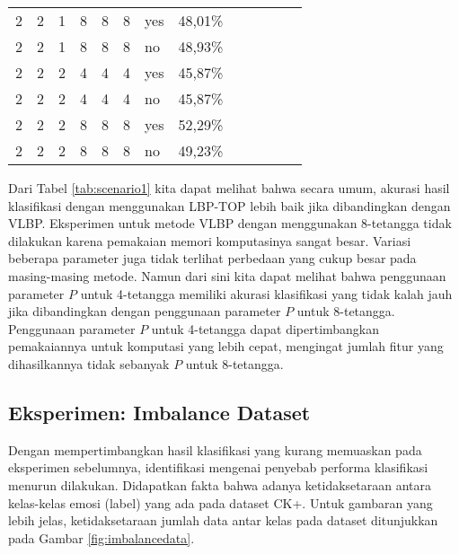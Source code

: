 \documentclass[review,3p,12pt,times]{elsarticle}
\begin{document}
\begin{table}[htbp]
\begin{tabular}{C{0.7cm}C{0.7cm}C{0.7cm}C{0.7cm}C{0.7cm}C{0.7cm}C{0.7cm}rC{0.7cm}C{0.7cm}C{0.7cm}C{0.7cm}r}
    2     & 2     & 1     & 8     & 8     & 8     & yes   & 48,01\% &              &       &       &       &  \\
    2     & 2     & 1     & 8     & 8     & 8     & no    & 48,93\% &              &       &       &       &  \\
    2     & 2     & 2     & 4     & 4     & 4     & yes   & 45,87\% &              &       &       &       &  \\
    2     & 2     & 2     & 4     & 4     & 4     & no    & 45,87\% &              &       &       &       &  \\
    2     & 2     & 2     & 8     & 8     & 8     & yes   & 52,29\% &              &       &       &       &  \\
    2     & 2     & 2     & 8     & 8     & 8     & no    & 49,23\% &              &       &       &       &  \\
    \bottomrule
    \end{tabular}%
  \label{tab:addlabel}%
\end{table}%

Dari Tabel \ref{tab:scenario1} kita dapat melihat bahwa secara umum, akurasi hasil klasifikasi dengan menggunakan LBP-TOP lebih baik jika dibandingkan dengan VLBP. Eksperimen untuk metode VLBP dengan menggunakan 8-tetangga tidak dilakukan karena pemakaian memori komputasinya sangat besar. Variasi beberapa parameter juga tidak terlihat perbedaan yang cukup besar pada masing-masing metode. Namun dari sini kita dapat melihat bahwa penggunaan parameter $P$ untuk 4-tetangga memiliki akurasi klasifikasi yang tidak kalah jauh jika dibandingkan dengan penggunaan parameter $P$ untuk 8-tetangga. Penggunaan parameter $P$ untuk 4-tetangga dapat dipertimbangkan pemakaiannya untuk komputasi yang lebih cepat, mengingat jumlah fitur yang dihasilkannya tidak sebanyak $P$ untuk 8-tetangga.

\subsection{Eksperimen: Imbalance Dataset}
\label{scenario2}

Dengan mempertimbangkan hasil klasifikasi yang kurang memuaskan pada eksperimen sebelumnya, identifikasi mengenai penyebab performa klasifikasi menurun dilakukan. Didapatkan fakta bahwa adanya ketidaksetaraan antara kelas-kelas emosi (label) yang ada pada dataset CK+. Untuk gambaran yang lebih jelas, ketidaksetaraan jumlah data antar kelas pada dataset ditunjukkan pada Gambar \ref{fig:imbalancedata}.
\end{document}
